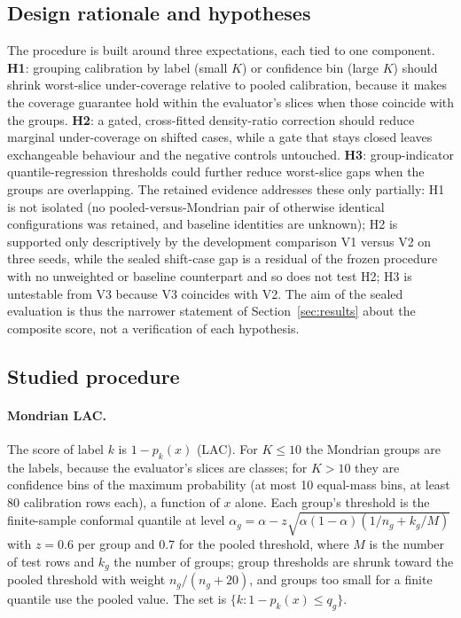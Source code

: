 \documentclass{article}
\begin{document}
\subsection{Design rationale and hypotheses}
The procedure is built around three expectations, each tied to one component. \textbf{H1}: grouping calibration by label (small $K$) or confidence bin (large $K$) should shrink worst-slice under-coverage relative to pooled calibration, because it makes the coverage guarantee hold within the evaluator's slices when those coincide with the groups. \textbf{H2}: a gated, cross-fitted density-ratio correction should reduce marginal under-coverage on shifted cases, while a gate that stays closed leaves exchangeable behaviour and the negative controls untouched. \textbf{H3}: group-indicator quantile-regression thresholds could further reduce worst-slice gaps when the groups are overlapping. The retained evidence addresses these only partially: H1 is not isolated (no pooled-versus-Mondrian pair of otherwise identical configurations was retained, and baseline identities are unknown); H2 is supported only descriptively by the development comparison V1 versus V2 on three seeds, while the sealed shift-case gap is a residual of the frozen procedure with no unweighted or baseline counterpart and so does not test H2; H3 is untestable from V3 because V3 coincides with V2. The aim of the sealed evaluation is thus the narrower statement of Section~\ref{sec:results} about the composite score, not a verification of each hypothesis.

\subsection{Studied procedure}
\paragraph{Mondrian LAC.}
The score of label $k$ is $1-p_k(x)$ (LAC). For $K\le10$ the Mondrian groups are the labels, because the evaluator's slices are classes; for $K>10$ they are confidence bins of the maximum probability (at most 10 equal-mass bins, at least 80 calibration rows each), a function of $x$ alone. Each group's threshold is the finite-sample conformal quantile at level $\alpha_g=\alpha-z\sqrt{\alpha(1-\alpha)(1/n_g+k_g/M)}$ with $z=0.6$ per group and $0.7$ for the pooled threshold, where $M$ is the number of test rows and $k_g$ the number of groups; group thresholds are shrunk toward the pooled threshold with weight $n_g/(n_g+20)$, and groups too small for a finite quantile use the pooled value. The set is $\{k: 1-p_k(x)\le q_{g}\}$.
\end{document}
